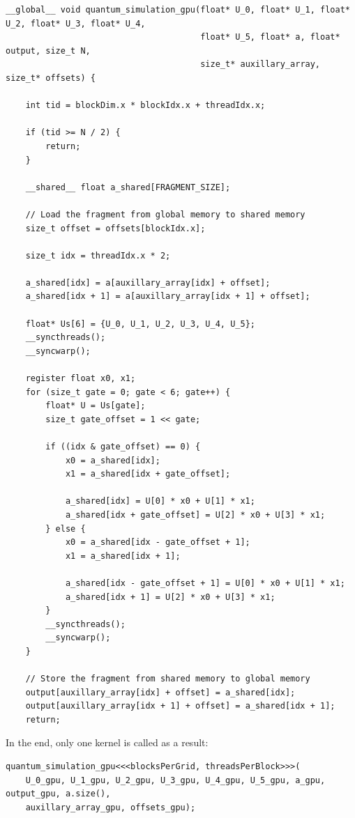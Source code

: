 \documentclass{article}
\begin{document}
\begin{verbatim}
__global__ void quantum_simulation_gpu(float* U_0, float* U_1, float* U_2, float* U_3, float* U_4,
                                       float* U_5, float* a, float* output, size_t N,
                                       size_t* auxillary_array, size_t* offsets) {
                                       
    int tid = blockDim.x * blockIdx.x + threadIdx.x;

    if (tid >= N / 2) {
        return;
    }

    __shared__ float a_shared[FRAGMENT_SIZE];

    // Load the fragment from global memory to shared memory
    size_t offset = offsets[blockIdx.x];

    size_t idx = threadIdx.x * 2;

    a_shared[idx] = a[auxillary_array[idx] + offset];
    a_shared[idx + 1] = a[auxillary_array[idx + 1] + offset];

    float* Us[6] = {U_0, U_1, U_2, U_3, U_4, U_5};
    __syncthreads();
    __syncwarp();

    register float x0, x1;
    for (size_t gate = 0; gate < 6; gate++) {
        float* U = Us[gate];
        size_t gate_offset = 1 << gate;

        if ((idx & gate_offset) == 0) {
            x0 = a_shared[idx];
            x1 = a_shared[idx + gate_offset];

            a_shared[idx] = U[0] * x0 + U[1] * x1;
            a_shared[idx + gate_offset] = U[2] * x0 + U[3] * x1;
        } else {
            x0 = a_shared[idx - gate_offset + 1];
            x1 = a_shared[idx + 1];

            a_shared[idx - gate_offset + 1] = U[0] * x0 + U[1] * x1;
            a_shared[idx + 1] = U[2] * x0 + U[3] * x1;
        }
        __syncthreads();
        __syncwarp();
    }

    // Store the fragment from shared memory to global memory
    output[auxillary_array[idx] + offset] = a_shared[idx];
    output[auxillary_array[idx + 1] + offset] = a_shared[idx + 1];
    return;
\end{verbatim}

In the end, only one kernel is called as a result:

\begin{verbatim}
quantum_simulation_gpu<<<blocksPerGrid, threadsPerBlock>>>(
    U_0_gpu, U_1_gpu, U_2_gpu, U_3_gpu, U_4_gpu, U_5_gpu, a_gpu, output_gpu, a.size(),
    auxillary_array_gpu, offsets_gpu);
\end{verbatim}
\end{document}
